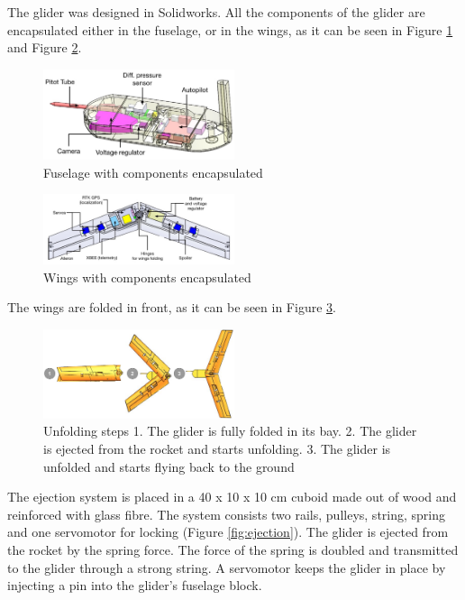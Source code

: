 The glider was designed in Solidworks. All the components of the glider are encapsulated either in the fuselage, or in the wings, as it can be seen in Figure \ref{f:fuseg} and Figure  \ref{f:wings}.


\begin{figure}[h!]
    \centering
        \includegraphics[width=0.5\textwidth]{img/fuselage.jpg}
        \caption{Fuselage with components encapsulated}
        \label{f:fuseg}
 \end{figure}

\begin{figure}[h!]
    \centering
        \includegraphics[width=0.5\textwidth]{img/wings.jpg}
        \caption{Wings with components encapsulated}
        \label{f:wings}
 \end{figure}


The wings are folded in front, as it can be seen in Figure \ref{f:folding}.

\begin{figure}[h!]
    \centering
        \includegraphics[width=0.5\textwidth]{img/folding.png}
        \caption{Unfolding steps 1. The glider is fully folded in its bay. 2. The glider is ejected from the rocket and starts unfolding. 3. The glider is unfolded and starts flying back to the ground}
        \label{f:folding}
 \end{figure}

The ejection system is placed in a 40 x 10 x 10 cm  cuboid made out of wood and reinforced with glass fibre. The system consists two rails, pulleys, string, spring and one servomotor for locking (Figure \ref{fig:ejection}). The glider is ejected from the rocket by the spring force. The force of the spring is doubled and transmitted to the glider through a strong string. A servomotor keeps the glider in place by injecting a pin into the glider's fuselage block.

